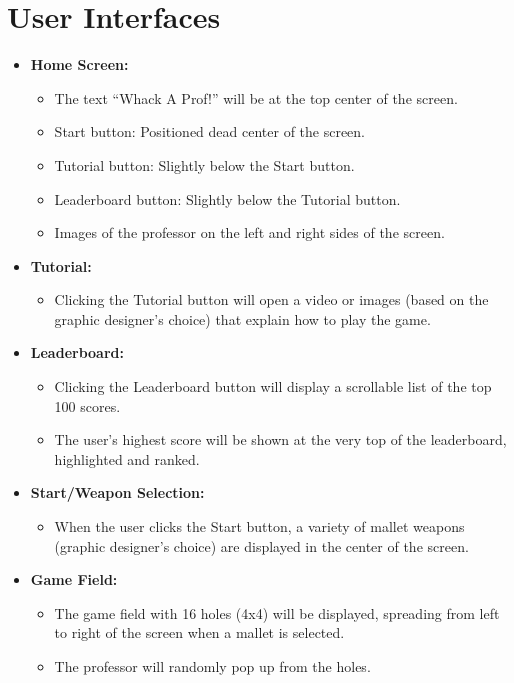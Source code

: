 \documentclass[11pt]{scrreprt}
\begin{document}
\section{User Interfaces}
\begin{itemize}
  \item \textbf{Home Screen:} 
    \begin{itemize}
        \item The text ``Whack A Prof!'' will be at the top center of the screen.
        \item Start button: Positioned dead center of the screen.
        \item Tutorial button: Slightly below the Start button.
        \item Leaderboard button: Slightly below the Tutorial button.
        \item Images of the professor on the left and right sides of the screen.
    \end{itemize}
  \item \textbf{Tutorial:}
    \begin{itemize}
        \item Clicking the Tutorial button will open a video or images (based on the graphic designer's choice) that explain how to play the game.
    \end{itemize}
  \item \textbf{Leaderboard:}
    \begin{itemize}
        \item Clicking the Leaderboard button will display a scrollable list of the top 100 scores.
        \item The user's highest score will be shown at the very top of the leaderboard, highlighted and ranked.
    \end{itemize}
  \item \textbf{Start/Weapon Selection:}
    \begin{itemize}
        \item When the user clicks the Start button, a variety of mallet weapons (graphic designer's choice) are displayed in the center of the screen.
    \end{itemize}
  \item \textbf{Game Field:}
    \begin{itemize}
        \item The game field with 16 holes (4x4) will be displayed, spreading from left to right of the screen when a mallet is selected.
        \item The professor will randomly pop up from the holes.

\end{itemize}
\end{itemize}
\end{document}
